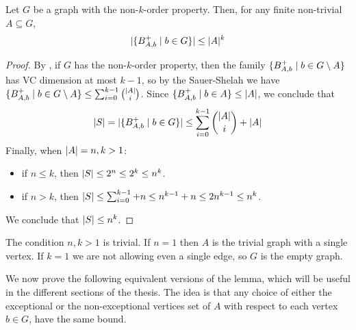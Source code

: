     \begin{lemma}[Claim 2.6] \label{lem:k_order_property_bounds_BAbs}
        Let $G$ be a graph with the non-$k$-order property.
        Then, for any finite non-trivial $A \subseteq G$,
        \[
            | \{ B^+_{A,b} \mid b \in G \} | \leq |A|^k
        \]
        \begin{proof}
            By , if $G$ has the non-$k$-order property,
            then the family $\{ B^+_{A,b} \mid b \in G \setminus A \}$ has VC dimension at most $k-1$,
            so by the Sauer-Shelah  we have
            $\{ B^+_{A,b} \mid b \in G \setminus A \} \leq \sum_{i=0}^{k-1} \binom{|A|}{i}$.
            Since $\{ B^+_{A,b} \mid b \in A \} \leq | A |$, we conclude that
            \[
                | S | = | \{ B^+_{A,b} \mid b \in G \} | \leq \sum_{i=0}^{k-1} \binom{|A|}{i} + |A|
            \]
            Finally, when $| A | = n,k > 1$: 
            \begin{itemize}
                \item if $n \leq k$, then $| S | \leq 2^n \leq 2^k \leq n^k$.
                \item if $n > k$, then $| S | \leq \sum_{i=0}^{k-1} + n \leq n^{k-1} + n \leq 2n^{k-1} \leq n^k$.
            \end{itemize}
            We conclude that $| S | \leq n^k$.
        \end{proof}
    \end{lemma}

    \begin{remark}
        The condition $n,k > 1$ is trivial.
        If $n=1$ then $A$ is the trivial graph with a single vertex.
        If $k=1$ we are not allowing even a single edge, so $G$ is the empty graph.
    \end{remark}

    We now prove the following equivalent versions of the lemma, which will be useful in the different sections of the
    thesis.
    The idea is that any choice of either the exceptional or the non-exceptional vertices set of $A$ with respect to
    each vertex $b \in G$, have the same bound.


